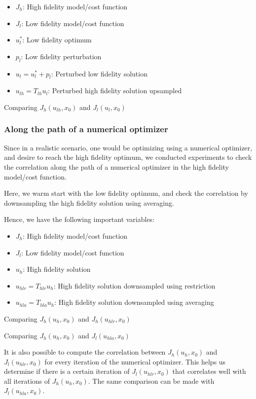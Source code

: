\documentclass{article}
\begin{document}
\begin{itemize}
  \item $J_h$: High fidelity model/cost function
  \item $J_l$: Low fidelity model/cost function
  \item $u_l^*$: Low fidelity optimum
  \item $p_l$: Low fidelity perturbation
  \item $u_l = u_l^* + p_l$: Perturbed low fidelity solution
  \item $u_{lh} = T_{lh} u_l$: Perturbed high fidelity solution upsampled
\end{itemize}

Comparing $J_h(u_{lh}, x_0)$ and $J_l(u_l, x_0)$

\subsubsection{Along the path of a numerical optimizer}

Since in a realistic scenario, one would be optimizing using a numerical optimizer, and desire to reach the high fidelity optimum,
we conducted experiments to check the correlation along the path of a numerical optimizer in the high fidelity model/cost function.

Here, we warm start with the low fidelity optimum, and check the correlation by downsampling the high fidelity solution using averaging.

Hence, we have the following important variables:

\begin{itemize}
  \item $J_h$: High fidelity model/cost function
  \item $J_l$: Low fidelity model/cost function
  \item $u_h$: High fidelity solution
  \item $u_{hlr} = T_{hlr} u_h$: High fidelity solution downsampled using restriction
  \item $u_{hla} = T_{hla} u_h$: High fidelity solution downsampled using averaging
\end{itemize}

Comparing $J_h(u_h, x_0)$ and $J_h(u_{hlr}, x_0)$

Comparing $J_h(u_h, x_0)$ and $J_l(u_{hla}, x_0)$

It is also possible to compute the correlation between $J_h(u_h, x_0)$ and $J_l(u_{hlr}, x_0)$ for every iteration of the numerical optimizer.
This helps us determine if there is a certain iteration of $J_l(u_{hlr}, x_0)$ that correlates well with all iterations of $J_h(u_h, x_0)$.
The same comparison can be made with $J_l(u_{hla}, x_0)$.
\end{document}
